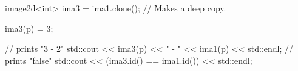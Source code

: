 image2d<int> ima3 = ima1.clone(); // Makes a deep copy.

ima3(p) = 3;

// prints "3 - 2"
std::cout << ima3(p) << " - " << ima1(p) << std::endl;
// prints "false"
std::cout << (ima3.id() == ima1.id()) << std::endl;
